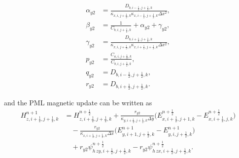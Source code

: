 \documentclass{article}
\numberwithin{equation}{section}
\numberwithin{figure}{section}
\begin{document}
\begin{align}
    \alpha_{y2} & =\frac{D_{b,i-\tfrac12,j+\tfrac12,k}}{\kappa_{x,i,j+\tfrac12,k}\kappa_{x,i-\tfrac12,j+\tfrac12,k}\Delta x^2}, \\
    \beta_{y2}  & =\frac{1}{C_{b,i,j+\tfrac12,k}}+\alpha_{y2}+\gamma_{y2},                                                      \\
    \gamma_{y2} & =\frac{D_{b,i+\tfrac12,j+\tfrac12,k}}{\kappa_{x,i,j+\tfrac12,k}\kappa_{x,i+\tfrac12,j+\tfrac12,k}\Delta x^2}, \\
    p_{y2}      & =\frac{C_{a,i,j+\tfrac12,k}}{C_{b,i,j+\tfrac12,k}},                                                           \\
    q_{y2}      & =D_{b,i-\tfrac12,j+\tfrac12,k},                                                                               \\
    r_{y2}      & =D_{b,i+\tfrac12,j+\tfrac12,k}.
\end{align}

and the PML magnetic update can be written as
\begin{equation}
    \begin{aligned}
        H_{z,i+\tfrac12,j+\tfrac12,k}^{n+1}
         & = H_{z,i+\tfrac12,j+\tfrac12,k}^{n+\frac12}
        +\frac{r_{y2}}{\kappa_{y,i+\tfrac12,j+\tfrac12,k}\Delta y}
        \Big(E_{x,i+\tfrac12,j+1,k}^{n+\frac12}-E_{x,i+\tfrac12,j,k}^{n+\frac12}\Big) \\
         & \quad
        -\frac{r_{y2}}{\kappa_{x,i+\tfrac12,j+\tfrac12,k}\Delta x}
        \Big(E_{y,i+1,j+\tfrac12,k}^{n+1}-E_{y,i,j+\tfrac12,k}^{n+1}\Big)             \\
         & \quad
        +r_{y2}\psi^{n+\frac12}_{h\,zy,i+\tfrac12,j+\tfrac12,k}
        -r_{y2}\psi^{n+\frac12}_{h\,zx,i+\tfrac12,j+\tfrac12,k}.
    \end{aligned}
    \label{eq:adi-second-hz-pml}
\end{equation}
\end{document}
